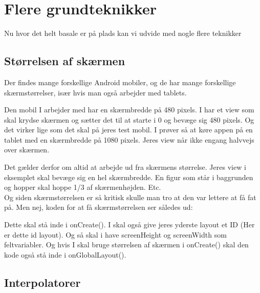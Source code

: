 \section{Flere grundteknikker}
Nu hvor det helt basale er på plads kan vi udvide med nogle flere teknikker
\subsection{Størrelsen af skærmen}
Der findes mange forskellige Android mobiler, og de har mange forskellige skærmstørrelser, især hvis man også arbejder med tablets. 
\begin{example}
	Den mobil I arbejder med har en skærmbredde på 480 pixels. I har et view som skal krydse skærmen og sætter det til at starte i 0 og bevæge sig 480 pixels. Og det virker lige som det skal på jeres test mobil. I prøver så at køre appen på en tablet med en skærmbredde på 1080 pixels. Jeres view når ikke engang halvvejs over skærmen. 
\end{example}
Det gælder derfor om altid at arbejde ud fra skærmens størrelse. Jeres view i eksemplet skal bevæge sig en hel skærmbredde. En figur som står i baggrunden og hopper skal hoppe 1/3 af skærmenhøjden. Etc.\\

Og siden skærmstørrelsen er så kritisk skulle man tro at den var lettere at få fat på. Men nej, koden for at få skærmstørrelsen ser således ud:
%			

Dette skal stå inde i onCreate(). I skal også give jeres yderste layout et ID (Her er dette id layout). Og så skal i have screenHeight og screenWidth som feltvariabler. Og hvis I skal bruge størrelsen af skærmen i onCreate() skal den kode også stå inde i onGlobalLayout().
\subsection{Interpolatorer}
